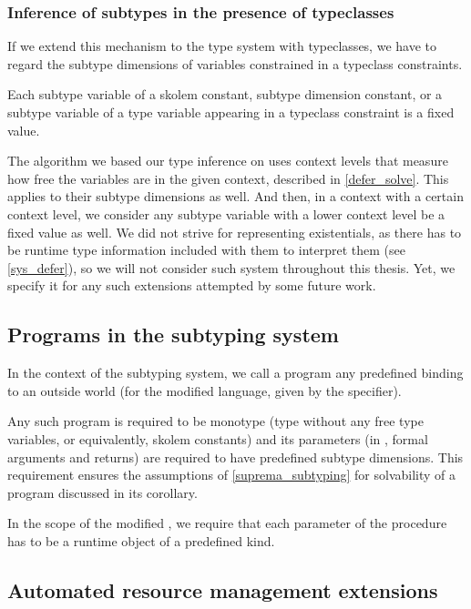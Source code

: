 \subsubsection{Inference of subtypes in the presence of typeclasses}

If we extend this mechanism to the type system with typeclasses, we have to regard the subtype dimensions of variables constrained in a typeclass constraints.

Each subtype variable of a skolem constant, subtype dimension constant, or a subtype variable of a type variable appearing in a typeclass constraint is a fixed value.

The algorithm we based our type inference on uses context levels that measure how free the variables are in the given context, described in \cref{defer_solve}. This applies to their subtype dimensions as well. And then, in a context with a certain context level, we consider any subtype variable with a lower context level be a fixed value as well. We did not strive for representing existentials, as there has to be runtime type information included with them to interpret them (see \cref{sys_defer}), so we will not consider such system throughout this thesis. Yet, we specify it for any such extensions attempted by some future work.

\subsection{Programs in the subtyping system}

In the context of the subtyping system, we call a program any predefined binding to an outside world (for the modified \cmm language, given by the  specifier).

Any such program is required to be monotype (type without any free type variables, or equivalently, skolem constants) and its parameters (in \cmm, formal arguments and returns) are required to have predefined subtype dimensions. This requirement ensures the assumptions of \cref{suprema_subtyping} for solvability of a program discussed in its corollary.

In the scope of the modified \cmm, we require that each parameter of the  procedure has to be a runtime object of a predefined kind.

\subsection{Automated resource management extensions}
\label{RAII}

